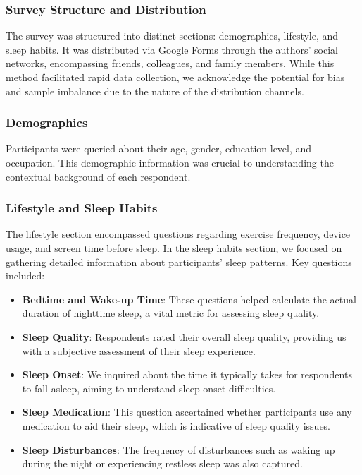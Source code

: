 \documentclass[conference]{IEEEtran}
\begin{document}
\subsubsection*{Survey Structure and Distribution}

The survey was structured into distinct sections: demographics, lifestyle, and sleep habits. It was distributed via Google Forms\cite{dhsurvey} through the authors' social networks, encompassing friends, colleagues, and family members. While this method facilitated rapid data collection, we acknowledge the potential for bias and sample imbalance due to the nature of the distribution channels.

\subsubsection*{Demographics}

Participants were queried about their age, gender, education level, and occupation. This demographic information was crucial to understanding the contextual background of each respondent.

\subsubsection*{Lifestyle and Sleep Habits}

The lifestyle section encompassed questions regarding exercise frequency, device usage, and screen time before sleep. In the sleep habits section, we focused on gathering detailed information about participants' sleep patterns. Key questions included:
\begin{itemize}
    \item\textbf{Bedtime and Wake-up Time}: These questions helped calculate the actual duration of nighttime sleep, a vital metric for assessing sleep quality.
    \item\textbf{Sleep Quality}: Respondents rated their overall sleep quality, providing us with a subjective assessment of their sleep experience.
    \item\textbf{Sleep Onset}: We inquired about the time it typically takes for respondents to fall asleep, aiming to understand sleep onset difficulties.
    \item\textbf{Sleep Medication}: This question ascertained whether participants use any medication to aid their sleep, which is indicative of sleep quality issues.
    \item\textbf{Sleep Disturbances}: The frequency of disturbances such as waking up during the night or experiencing restless sleep was also captured.
\end{itemize}
\end{document}
